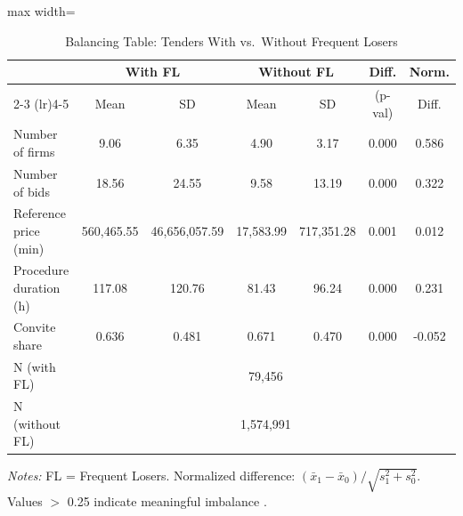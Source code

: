 \begin{table}[htbp]
\centering
\caption{Balancing Table: Tenders With vs.\ Without Frequent Losers}
\label{tab:balance}
\begin{adjustbox}{max width=\textwidth}
\begin{threeparttable}
\small
\begin{tabular}{lcccccc}
\toprule
 & \multicolumn{2}{c}{With FL} & \multicolumn{2}{c}{Without FL} & Diff. & Norm. \\
\cmidrule(lr){2-3} \cmidrule(lr){4-5}
 & Mean & SD & Mean & SD & (p-val) & Diff. \\
\midrule
Number of firms & 9.06 & 6.35 & 4.90 & 3.17 & 0.000 & 0.586 \\
Number of bids & 18.56 & 24.55 & 9.58 & 13.19 & 0.000 & 0.322 \\
Reference price (min) & 560,465.55 & 46,656,057.59 & 17,583.99 & 717,351.28 & 0.001 & 0.012 \\
Procedure duration (h) & 117.08 & 120.76 & 81.43 & 96.24 & 0.000 & 0.231 \\
Convite share & 0.636 & 0.481 & 0.671 & 0.470 & 0.000 & -0.052 \\
\midrule
N (with FL) & \multicolumn{6}{c}{79,456} \\
N (without FL) & \multicolumn{6}{c}{1,574,991} \\
\bottomrule
\end{tabular}
\begin{tablenotes}
\small
\item \textit{Notes:} FL = Frequent Losers. Normalized difference:
$(\bar{x}_1 - \bar{x}_0) / \sqrt{s_1^2 + s_0^2}$.
Values $>$ 0.25 indicate meaningful imbalance \citep{imbens2015causal}.
\end{tablenotes}
\end{threeparttable}
\end{adjustbox}
\end{table}
